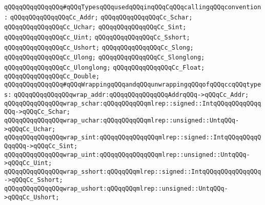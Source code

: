 \verb|qQQqqQQqqQQqqQQq#qQQqTypesqQQqusedqQQqinqQQqCqQQqcallingqQQqconvention:|\newline
\verb|qQQqqQQqqQQqqQQqCc_Addr;|\newline
\verb|qQQqqQQqqQQqqQQqCc_Schar;|\newline
\verb|qQQqqQQqqQQqqQQqCc_Uchar;|\newline
\verb|qQQqqQQqqQQqqQQqCc_Sint;|\newline
\verb|qQQqqQQqqQQqqQQqCc_Uint;|\newline
\verb|qQQqqQQqqQQqqQQqCc_Sshort;|\newline
\verb|qQQqqQQqqQQqqQQqCc_Ushort;|\newline
\verb|qQQqqQQqqQQqqQQqCc_Slong;|\newline
\verb|qQQqqQQqqQQqqQQqCc_Ulong;|\newline
\verb|qQQqqQQqqQQqqQQqCc_Slonglong;|\newline
\verb|qQQqqQQqqQQqqQQqCc_Ulonglong;|\newline
\verb|qQQqqQQqqQQqqQQqCc_Float;|\newline
\verb|qQQqqQQqqQQqqQQqCc_Double;|\newline
\newline
\newline
\newline
\verb|qQQqqQQqqQQqqQQq#qQQqWrappingqQQqandqQQqunwrappingqQQqofqQQqccqQQqtypes:|\newline
\newline
\verb|qQQqqQQqqQQqqQQqwrap_addr:qQQqqQQqqQQqqQQqAddrqQQq->qQQqCc_Addr;|\newline
\newline
\verb|qQQqqQQqqQQqqQQqwrap_schar:qQQqqQQqqQQqmlrep::signed::IntqQQqqQQqqQQqqQQq->qQQqCc_Schar;|\newline
\verb|qQQqqQQqqQQqqQQqwrap_uchar:qQQqqQQqqQQqmlrep::unsigned::UntqQQq->qQQqCc_Uchar;|\newline
\newline
\verb|qQQqqQQqqQQqqQQqwrap_sint:qQQqqQQqqQQqqQQqmlrep::signed::IntqQQqqQQqqQQqqQQq->qQQqCc_Sint;|\newline
\verb|qQQqqQQqqQQqqQQqwrap_uint:qQQqqQQqqQQqqQQqmlrep::unsigned::UntqQQq->qQQqCc_Uint;|\newline
\newline
\verb|qQQqqQQqqQQqqQQqwrap_sshort:qQQqqQQqmlrep::signed::IntqQQqqQQqqQQqqQQq->qQQqCc_Sshort;|\newline
\verb|qQQqqQQqqQQqqQQqwrap_ushort:qQQqqQQqmlrep::unsigned::UntqQQq->qQQqCc_Ushort;|\newline
